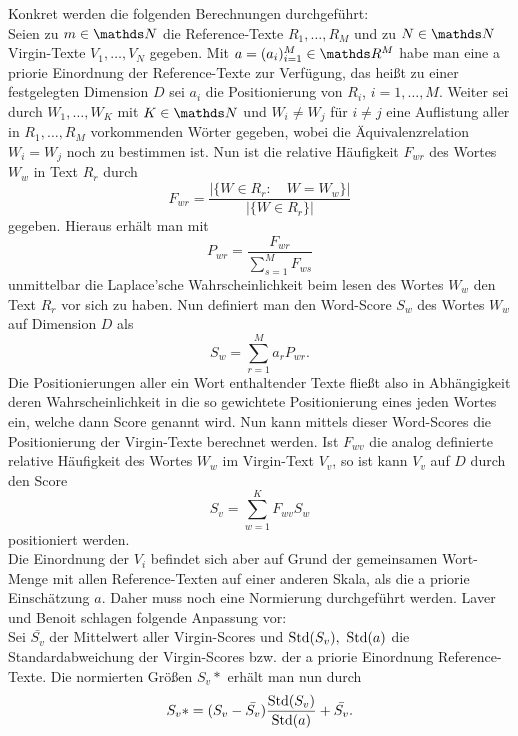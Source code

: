 Konkret werden die folgenden Berechnungen durchgeführt: \\
Seien zu $m\in\N$ die Reference-Texte  $R_1,\ldots,R_M$ und zu $N\in\N$ Virgin-Texte $V_1,\ldots,V_N$ gegeben. 
Mit $a=(a_i)_{i=1}^M\in\R^M$ habe man eine a priorie Einordnung der Reference-Texte zur Verfügung, 
das heißt zu einer festgelegten Dimension $D$ sei $a_i$ die Positionierung von $R_i$, $i=1,\ldots,M$. 
Weiter sei durch $W_1,\ldots,W_K$ mit $K\in\N$ und $W_i\neq W_j$ für $i\neq j$ 
eine Auflistung aller in $R_1,\ldots,R_M$ vorkommenden Wörter gegeben, 
wobei die Äquivalenzrelation $W_i = W_j$ noch zu bestimmen ist. 
Nun ist die relative Häufigkeit $F_{wr}$ des Wortes $W_w$ in Text $R_r$ durch
\begin{displaymath}
F_{wr} = \frac{|\{W\in R_r:\quad W=W_w  \}|}{|\{W\in R_r\}|}
\end{displaymath}
gegeben. Hieraus erhält man mit
\begin{displaymath}
P_{wr} = \frac{F_{wr}}{\sum_{s=1}^M F_{ws}}
\end{displaymath}
unmittelbar die Laplace'sche Wahrscheinlichkeit beim lesen des Wortes $W_w$ den Text $R_r$ vor sich zu haben. Nun definiert man den Word-Score $S_{w}$ des Wortes $W_w$ auf Dimension $D$ als
\begin{displaymath}
S_w = \sum_{r=1}^M a_r P_{wr}.
\end{displaymath}
Die Positionierungen aller ein Wort enthaltender Texte fließt also in Abhängigkeit deren Wahrscheinlichkeit in die so gewichtete Positionierung eines jeden Wortes ein, welche dann Score genannt wird. Nun kann mittels dieser Word-Scores die Positionierung der Virgin-Texte berechnet werden. Ist $F_{wv}$ die analog definierte relative Häufigkeit des Wortes $W_w$ im Virgin-Text $V_v$, so ist kann $V_v$ auf $D$ durch den Score
\begin{displaymath}
S_v = \sum_{w=1}^K F_{wv} S_w
\end{displaymath}
positioniert werden. \\
Die Einordnung der $V_i$ befindet sich aber auf Grund der gemeinsamen Wort-Menge mit allen Reference-Texten auf einer anderen Skala, als die a priorie Einschätzung $a$. 
Daher muss noch eine Normierung durchgeführt werden. Laver und Benoit schlagen folgende Anpassung vor: \\
Sei $\bar{S_v}$ der Mittelwert aller Virgin-Scores und $\operatorname{Std}(S_v),~\operatorname{Std}(a)$ die Standardabweichung der Virgin-Scores bzw. der a priorie Einordnung Reference-Texte. Die normierten Größen $S_v*$ erhält man nun durch
\begin{displaymath}
S_v* = (S_v - \bar{S_v}) \frac{\operatorname{Std}(S_v)}{\operatorname{Std}(a)} +\bar{S_v}. 
\end{displaymath} 
 
